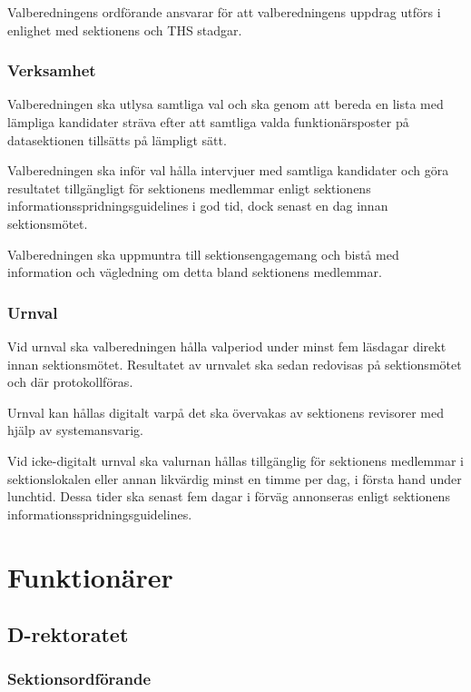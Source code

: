 \documentclass{dgovdoc}
\begin{document}
Valberedningens ordförande ansvarar för att valberedningens uppdrag
utförs i enlighet med sektionens och THS stadgar.

\subsubsection{Verksamhet}

Valberedningen ska utlysa samtliga val och ska genom att bereda en lista med
lämpliga kandidater sträva efter att samtliga valda funktionärsposter på
datasektionen tillsätts på lämpligt sätt.

Valberedningen ska inför val hålla intervjuer med samtliga kandidater och göra
resultatet tillgängligt för sektionens medlemmar enligt sektionens
informationsspridningsguidelines i god tid, dock senast en dag innan
sektionsmötet.

Valberedningen ska uppmuntra till sektionsengagemang och bistå med information
och vägledning om detta bland sektionens medlemmar.

\subsubsection{Urnval}

Vid urnval ska valberedningen hålla valperiod under minst fem läsdagar direkt
innan sektionsmötet. Resultatet av urnvalet ska sedan redovisas på
sektionsmötet och där protokollföras.

Urnval kan hållas digitalt varpå det ska övervakas av sektionens revisorer med
hjälp av systemansvarig.

Vid icke-digitalt urnval ska valurnan hållas tillgänglig för sektionens
medlemmar i sektionslokalen eller annan likvärdig minst en timme per dag, i
första hand under lunchtid. Dessa tider ska senast fem dagar i förväg
annonseras enligt sektionens informationsspridningsguidelines.

\section{Funktionärer}

\subsection{D-rektoratet}

\subsubsection{Sektionsordförande}
\end{document}
